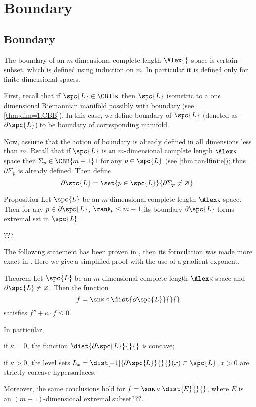 \chapter{Boundary}


\section{Boundary}\label{sec:bry}

The boundary of an $m$-dimensional complete length $\Alex{}$ space is certain subset,
which is defined using induction on $m$.
In particular it is defined only for finite dimensional spaces.

First, recall that if $\spc{L}\in\CBB 1\kappa$ then $\spc{L}$ isometric to a one dimensional Riemannian manifold possibly with boundary (see \ref{thm:dim=1.CBB}).
In this case, we define boundary of $\spc{L}$ (denoted as $\partial \spc{L}$) to be boundary of corresponding manifold.

Now, assume that the notion of boundary is already defined in all dimensions less than $m$.
Recall that if $\spc{L}$ is an $m$-dimensional complete length $\Alex\kappa$ space then $\Sigma_p\in\CBB{m-1}1$ for any $p\in \spc{L}$ (see \ref{thm:tan4finite});
thus $\partial\Sigma_p$ is already defined.
Then define 
\[\partial \spc{L}=\set{p\in \spc{L}}{\partial\Sigma_p\not=\emptyset}.\]


\begin{thm}{Proposition}
Let $\spc{L}$ be an $m$-dimensional complete length $\Alex\kappa$ space.
Then for any $p\in\partial\spc{L}$, $\rank_p\le m-1$.its boundary $\partial \spc{L}$ forms extremal set in $\spc{L}$. 
\end{thm}

???\qeds


The following statement has been proven in \cite{perelman:spaces2}, then its
formulation was made more exact in \cite{alexander-bishop:fk}. 
Here we give a simplified proof with the use of a gradient exponent.

\begin{thm}{Theorem} \label{thm:dist-to-bry} 
Let $\spc{L}$ be an $m$ dimensional complete length $\Alex\kappa$ space and
$\partial \spc{L}\not=\emptyset$.
Then the function 
\[f=\sn\kappa\circ\dist{\partial \spc{L}}{}{}\] 
satisfies $f''+\kappa\cdot  f\le 0$.

In particular,
\begin{subthm}{} if $\kappa=0$, the function $\dist{\partial \spc{L}}{}{}$ is concave;
\end{subthm}

\begin{subthm}{} if $\kappa>0$, the level sets $L_x=\dist[-1]{\partial \spc{L}}{}{}(x)\subset \spc{L}$, $x>0$
are strictly concave hypersurfaces.
\end{subthm}

Moreover, the same conclusions hold for $f=\sn\kappa\circ\dist{E}{}{}$, where $E$ is an $(m-1)$-dimensional extremal subset???.
\end{thm}

